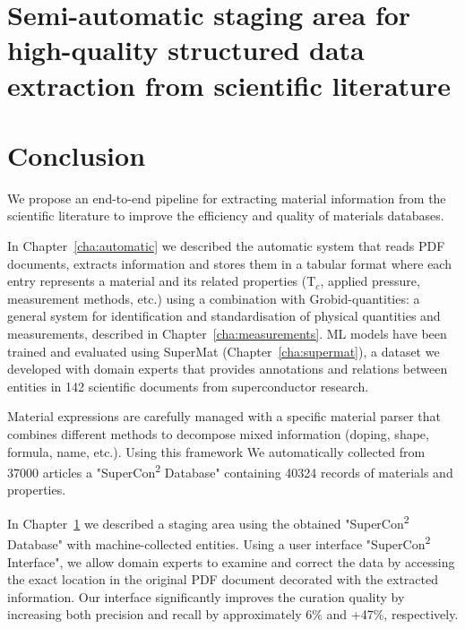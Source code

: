 \documentclass[a4paper,12pt]{report}
\newcommand{\tc}{T$_{c}$}
\begin{document}
\chapter{Semi-automatic staging area for high-quality structured data extraction from scientific literature}
\label{cha:curation}


\chapter{Conclusion}
We propose an end-to-end pipeline for extracting material information from the scientific literature to improve the efficiency and quality of materials databases.

In Chapter~\ref{cha:automatic} we described the automatic system that reads PDF documents, extracts information and stores them in a tabular format where each entry represents a material and its related properties (\tc, applied pressure, measurement methods, etc.) using a combination with Grobid-quantities: a general system for identification and standardisation of physical quantities and measurements, described in Chapter~\ref{cha:measurements}.
ML models have been trained and evaluated using SuperMat (Chapter~\ref{cha:supermat}), a dataset we developed with domain experts that provides annotations and relations between entities in 142 scientific documents from superconductor research.

Material expressions are carefully managed with a specific material parser that combines different methods to decompose mixed information (doping, shape, formula, name, etc.). 
Using this framework We automatically collected from 37000 articles a "SuperCon\textsuperscript{2} Database" containing 40324 records of materials and properties.

In Chapter~\ref{cha:curation} we described a staging area using the obtained "SuperCon\textsuperscript{2} Database" with machine-collected entities. Using a user interface "SuperCon\textsuperscript{2} Interface", we allow domain experts to examine and correct the data by accessing the exact location in the original PDF document decorated with the extracted information. 
Our interface significantly improves the curation quality by increasing both precision and recall by approximately 6\% and +47\%, respectively.


\newpage



\end{document}
